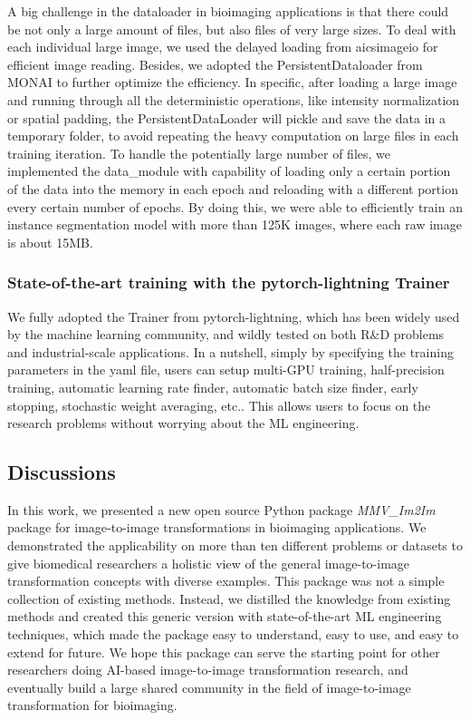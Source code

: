 A big challenge in the dataloader in bioimaging applications is that there could be not only a large amount of files, but also files of very large sizes. To deal with each individual large image, we used the delayed loading from aicsimageio for efficient image reading. Besides, we adopted the PersistentDataloader from MONAI to further optimize the efficiency. In specific, after loading a large image and running through all the deterministic operations, like intensity normalization or spatial padding, the PersistentDataLoader will pickle and save the data in a temporary folder, to avoid repeating the heavy computation on large files in each training iteration. To handle the potentially large number of files, we implemented the data\_module with capability of loading only a certain portion of the data into the memory in each epoch and reloading with a different portion every certain number of epochs. By doing this, we were able to efficiently train an instance segmentation model with more than 125K images, where each raw image is about 15MB.

\hypertarget{state-of-the-art-training-with-the-pytorch-lightning-trainer}{%
\subsubsection{State-of-the-art training with the pytorch-lightning Trainer}\label{state-of-the-art-training-with-the-pytorch-lightning-trainer}}

We fully adopted the Trainer from pytorch-lightning, which has been widely used by the machine learning community, and wildly tested on both R\&D problems and industrial-scale applications. In a nutshell, simply by specifying the training parameters in the yaml file, users can setup multi-GPU training, half-precision training, automatic learning rate finder, automatic batch size finder, early stopping, stochastic weight averaging, etc.. This allows users to focus on the research problems without worrying about the ML engineering.

\hypertarget{discussions}{%
\subsection{Discussions}\label{discussions}}

In this work, we presented a new open source Python package \emph{MMV\_Im2Im} package for image-to-image transformations in bioimaging applications. We demonstrated the applicability on more than ten different problems or datasets to give biomedical researchers a holistic view of the general image-to-image transformation concepts with diverse examples. This package was not a simple collection of existing methods. Instead, we distilled the knowledge from existing methods and created this generic version with state-of-the-art ML engineering techniques, which made the package easy to understand, easy to use, and easy to extend for future. We hope this package can serve the starting point for other researchers doing AI-based image-to-image transformation research, and eventually build a large shared community in the field of image-to-image transformation for bioimaging.

